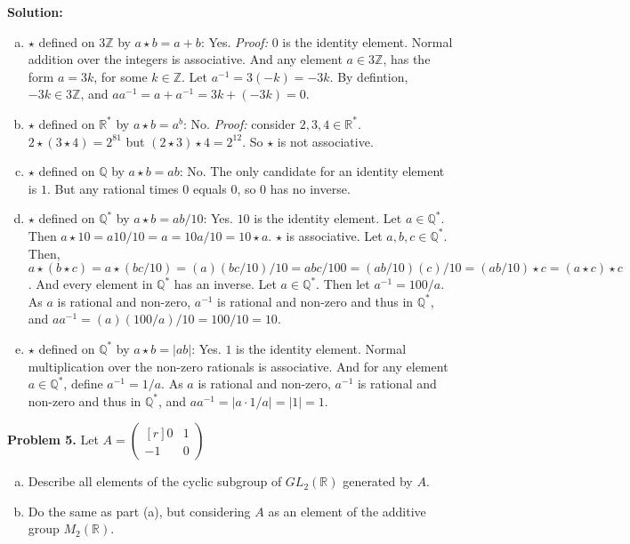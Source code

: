 \documentclass[12pt, letterpaper]{article}
\newenvironment{problem}
    [1]
    {\noindent \textbf{Problem #1.}}
    {\vspace{3mm}}
\newenvironment{solution}
    [0]
    {\noindent \textbf{Solution:}} 
    {\vspace{3mm}}
\begin{document}
\begin{solution}
    \begin{enumerate}[(a)]
        \item $\star$ defined on $3\mathbb{Z}$ by $a \star b = a + b$: Yes. 
        \emph{Proof:} $0$ is the identity element. Normal addition over
        the integers is associative. And any element $a \in 3\mathbb{Z}$, has the
        form $a = 3k$, for some $k \in \mathbb{Z}$. Let $a^{-1} = 3(-k) = -3k$. By defintion,
        $-3k \in 3\mathbb{Z}$, and $aa^{-1} = a + a^{-1} = 3k + (-3k) = 0$.

        \item $\star$ defined on $\mathbb{R}^*$ by $a \star b = a^b$: No. \emph{Proof:}
        consider $2, 3, 4 \in \mathbb{R}^*$. $2 \star (3 \star 4) = 2^{81}$ but
        $(2 \star 3) \star 4 = 2^{12}$. So $\star$ is not associative.

        \item $\star$ defined on $\mathbb{Q}$ by $a \star b = ab$: No. The only candidate
        for an identity element is $1$. But any rational times $0$ equals $0$, so $0$ has
        no inverse.

        \item $\star$ defined on $\mathbb{Q}^*$ by $a \star b = ab/10$: Yes. $10$ is the 
        identity element. Let $a \in \mathbb{Q}^*$. Then $a \star 10 = a10/10 = a = 10a/10 =
        10 \star a$. $\star$ is associative. Let $a, b, c \in \mathbb{Q}^*$. Then, $a \star
        (b \star c) = a \star (bc/10) = (a)(bc/10)/10 = abc/100 = (ab/10)(c)/10 = (ab/10) 
        \star c = (a \star c) \star c$. And every element in $\mathbb{Q}^*$ has an inverse.
        Let $a \in \mathbb{Q}^*$. Then let $a^{-1} = 100/a$. As $a$ is rational and non-zero, 
        $a^{-1}$ is rational and non-zero and thus in $\mathbb{Q}^*$, and $aa^{-1} = 
        (a)(100/a)/10 = 100 / 10 = 10$.

        \item $\star$ defined on $\mathbb{Q}^*$ by $a \star b = |ab|$: Yes. $1$ is the identity
        element. Normal multiplication over the non-zero rationals is associative. And for any
        element $a \in \mathbb{Q}^*$, define $a^{-1} = 1/a$. As $a$ is rational and non-zero,
        $a^{-1}$ is rational and non-zero and thus in $\mathbb{Q}^*$, and $aa^{-1} = 
        |a \cdot 1/a| = |1| = 1$.
    \end{enumerate}
\end{solution}

\begin{problem}{5}
    Let $A = \begin{pmatrix*}[r] 0 & 1 \\ -1 & 0 \end{pmatrix*}$
    \begin{enumerate}[(a)]
        \item Describe all elements of the cyclic subgroup of $GL_2(\mathbb{R})$ generated
        by $A$.
        \item Do the same as part (a), but considering $A$ as an element of the additive
        group $M_2(\mathbb{R})$.
    \end{enumerate}
\end{problem}
\end{document}
